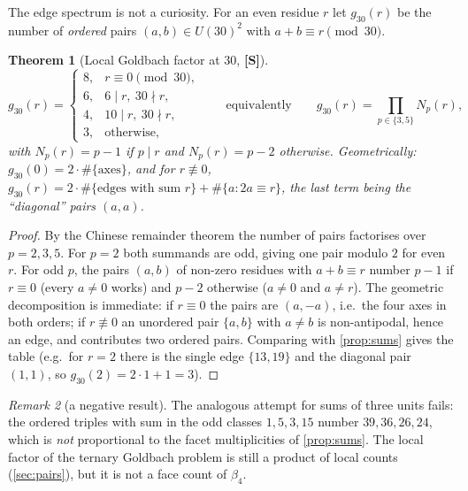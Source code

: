 \documentclass[11pt,a4paper]{article}
\newcommand{\statS}{\textsf{\textbf{[S]}}}
\theoremstyle{plain}
\newtheorem{theorem}{Theorem}[section]
\theoremstyle{definition}
\theoremstyle{remark}
\newtheorem{remark}[theorem]{Remark}
\begin{document}
The edge spectrum is not a curiosity. For an even residue $r$ let $g_{30}(r)$
be the number of \emph{ordered} pairs $(a,b)\in U(30)^2$ with $a+b\equiv
r\pmod{30}$.

\begin{theorem}[Local Goldbach factor at 30, \statS]\label{thm:B1}
\[
g_{30}(r)=\begin{cases}8,& r\equiv0 \pmod{30},\\ 6,& 6\mid r,\ 30\nmid r,\\
4,& 10\mid r,\ 30\nmid r,\\ 3,&\text{otherwise,}\end{cases}
\qquad\text{equivalently}\qquad g_{30}(r)=\prod_{p\in\{3,5\}}N_p(r),
\]
with $N_p(r)=p-1$ if $p\mid r$ and $N_p(r)=p-2$ otherwise. Geometrically:
$g_{30}(0)=2\cdot\#\{\text{axes}\}$, and for $r\not\equiv0$,
$g_{30}(r)=2\cdot\#\{\text{edges with sum }r\}+\#\{a: 2a\equiv r\}$, the last
term being the ``diagonal'' pairs $(a,a)$.
\end{theorem}
\begin{proof}
By the Chinese remainder theorem the number of pairs factorises over $p=2,3,5$.
For $p=2$ both summands are odd, giving one pair modulo $2$ for even $r$. For
odd $p$, the pairs $(a,b)$ of non-zero residues with $a+b\equiv r$ number
$p-1$ if $r\equiv0$ (every $a\ne0$ works) and $p-2$ otherwise ($a\ne0$ and
$a\ne r$). The geometric decomposition is immediate: if $r\equiv0$ the pairs
are $(a,-a)$, i.e.\ the four axes in both orders; if $r\not\equiv0$ an
unordered pair $\{a,b\}$ with $a\ne b$ is non-antipodal, hence an edge, and
contributes two ordered pairs. Comparing with \cref{prop:sums} gives the table
(e.g.\ for $r=2$ there is the single edge $\{13,19\}$ and the diagonal pair
$(1,1)$, so $g_{30}(2)=2\cdot1+1=3$).
\end{proof}

\begin{remark}[a negative result]
The analogous attempt for sums of three units fails: the ordered triples with
sum in the odd classes $1,5,3,15$ number $39,36,26,24$, which is \emph{not}
proportional to the facet multiplicities of \cref{prop:sums}. The local factor
of the ternary Goldbach problem is still a product of local counts
(\cref{sec:pairs}), but it is not a face count of $\beta_4$.
\end{remark}
\end{document}
